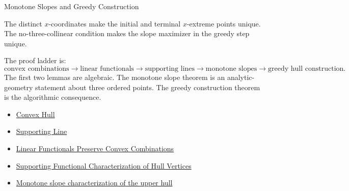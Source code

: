 \begin{topicbox}{Monotone Slopes and Greedy Construction}
\begin{remark*}[Exposition]
The distinct \(x\)-coordinates make the initial and terminal \(x\)-extreme
points unique. The no-three-collinear condition makes the slope maximizer in
the greedy step unique.
\end{remark*}

\begin{remark*}[Exposition]
The proof ladder is:
\[
\text{convex combinations}
\to
\text{linear functionals}
\to
\text{supporting lines}
\to
\text{monotone slopes}
\to
\text{greedy hull construction}.
\]
The first two lemmas are algebraic. The monotone slope theorem is an
analytic-geometry statement about three ordered points. The greedy construction
theorem is the algorithmic consequence.
\end{remark*}

\begin{dependencies}
\begin{itemize}
  \item \hyperref[def:computational-geometry-convex-hull]{Convex Hull}
  \item \hyperref[def:computational-geometry-supporting-line]{Supporting Line}
  \item \hyperref[lem:computational-geometry-linear-functionals-convex-combinations]{Linear Functionals Preserve Convex Combinations}
  \item \hyperref[thm:computational-geometry-supporting-functional-hull-vertices]{Supporting Functional Characterization of Hull Vertices}
  \item \hyperref[thm:computational-geometry-monotone-slope-upper-hull]{Monotone slope characterization of the upper hull}
\end{itemize}
\end{dependencies}
\end{topicbox}
